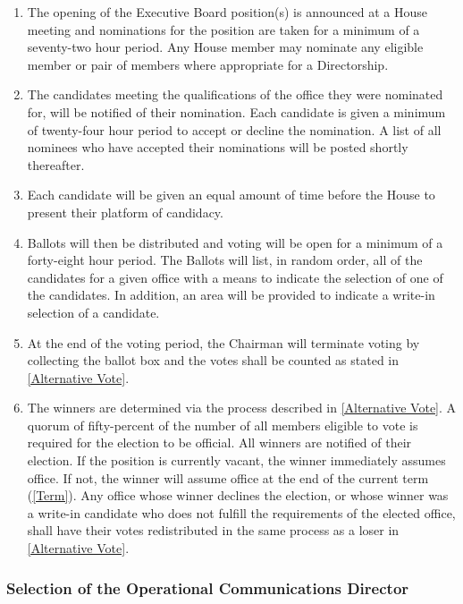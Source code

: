 \documentclass{article}
\newcommand{\asubsection}[1]{\subsubsection{#1} \label{#1}}
\begin{document}
\begin{enumerate}
	\item The opening of the Executive Board position(s) is announced at a House meeting and nominations for the position are taken for a minimum of a seventy-two hour period.
		Any House member may nominate any eligible member or pair of members where appropriate for a Directorship.
	\item The candidates meeting the qualifications of the office they were nominated for, will be notified of their nomination.
		Each candidate is given a minimum of twenty-four hour period to accept or decline the nomination.
		A list of all nominees who have accepted their nominations will be posted shortly thereafter.
	\item Each candidate will be given an equal amount of time before the House to present their platform of candidacy.
	\item Ballots will then be distributed and voting will be open for a minimum of a forty-eight hour period.
    The Ballots will list, in random order, all of the candidates for a given office with a means to indicate the selection of one of the candidates.
    In addition, an area will be provided to indicate a write-in selection of a candidate.
	\item At the end of the voting period, the Chairman will terminate voting by collecting the ballot box and the votes shall be counted as stated in \ref{Alternative Vote}.
	\item The winners are determined via the process described in \ref{Alternative Vote}.
    A quorum of fifty-percent of the number of all members eligible to vote is required for the election to be official.
    All winners are notified of their election.
    If the position is currently vacant, the winner immediately assumes office.
    If not, the winner will assume office at the end of the current term (\ref{Term}).
    Any office whose winner declines the election, or whose winner was a write-in candidate who does not fulfill the requirements of the elected office, shall have their votes redistributed in the same process as a loser in \ref{Alternative Vote}.
\end{enumerate}
\asubsection{Selection of the Operational Communications Director}
\end{document}
